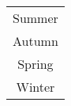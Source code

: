\documentclass[all-cards.tex]{subfiles}
\begin{document}
		{
			\begin{tabular}{c}
				Summer \\
				Autumn \\
				Spring \\
				Winter \\
			\end{tabular}
		}
\end{document}
